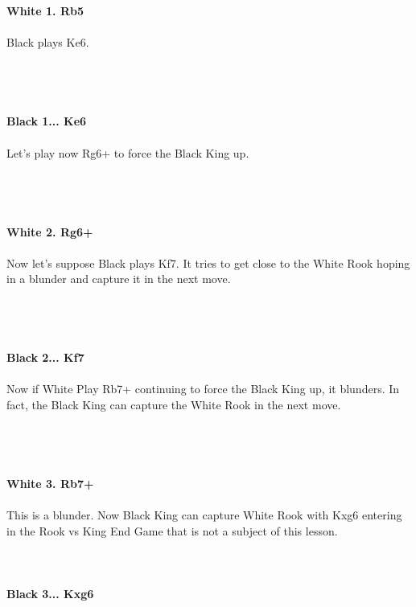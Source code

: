 \documentclass{article}
\begin{document}
\\
\\
\textbf{White 1. Rb5}\\
\\
Black plays Ke6.\\\\
\\

\\
\\
\textbf{Black 1... Ke6}\\
\\
Let's play now Rg6+ to force the Black King up.\\\\
\\

\\
\\
\textbf{White 2. Rg6+}\\
\\
Now let's suppose Black plays Kf7. It tries to get close to the White Rook hoping in a blunder and capture it in the next move.\\\\
\\

\\
\\
\textbf{Black 2... Kf7}\\
\\
Now if White Play Rb7+ continuing to force the Black King up, it blunders. In fact, the Black King can capture the White Rook in the next move.\\\\
\\

\\
\\
\textbf{White 3. Rb7+}\\
\\
This is a blunder. Now Black King can capture White Rook with Kxg6 entering in the Rook vs King End Game that is not a subject of this lesson.\\
\\

\\
\\
\textbf{Black 3... Kxg6}\\
\end{document}
